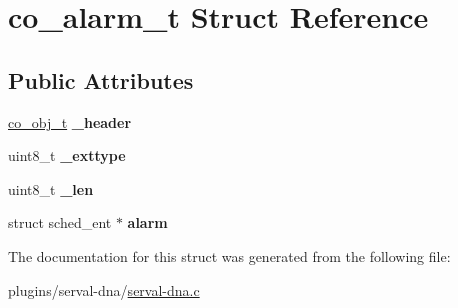 \hypertarget{structco__alarm__t}{\section{co\+\_\+alarm\+\_\+t Struct Reference}
\label{structco__alarm__t}
}
\subsection*{Public Attributes}
\begin{DoxyCompactItemize}
\item 
\hypertarget{structco__alarm__t_a10521d7b727aa239485cf239d4956314}{\hyperlink{structco__obj__t}{co\+\_\+obj\+\_\+t} {\bfseries \+\_\+header}}\label{structco__alarm__t_a10521d7b727aa239485cf239d4956314}

\item 
\hypertarget{structco__alarm__t_a9412dc0542f8bc5efc017eb97f062170}{uint8\+\_\+t {\bfseries \+\_\+exttype}}\label{structco__alarm__t_a9412dc0542f8bc5efc017eb97f062170}

\item 
\hypertarget{structco__alarm__t_aa2e64c17f5d086951fd1091c75441a84}{uint8\+\_\+t {\bfseries \+\_\+len}}\label{structco__alarm__t_aa2e64c17f5d086951fd1091c75441a84}

\item 
\hypertarget{structco__alarm__t_a235f538b56acb0478b1f7eacf717cc61}{struct sched\+\_\+ent $\ast$ {\bfseries alarm}}\label{structco__alarm__t_a235f538b56acb0478b1f7eacf717cc61}

\end{DoxyCompactItemize}


The documentation for this struct was generated from the following file\+:\begin{DoxyCompactItemize}
\item 
plugins/serval-\/dna/\hyperlink{serval-dna_8c}{serval-\/dna.\+c}\end{DoxyCompactItemize}
